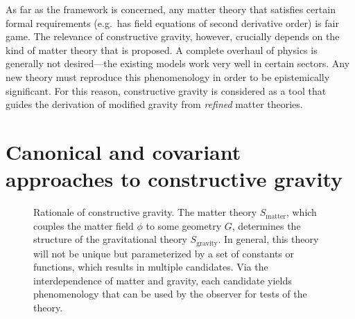 As far as the framework is concerned, any matter theory that satisfies certain formal requirements (e.g.~has field equations of second derivative order) is fair game. The relevance of constructive gravity, however, crucially depends on the kind of matter theory that is proposed. A complete overhaul of physics is generally not desired---the existing models work very well in certain sectors. Any new theory must reproduce this phenomenology in order to be epistemically significant. For this reason, constructive gravity is considered as a tool that guides the derivation of modified gravity from \emph{refined} matter theories.

\section{Canonical and covariant approaches to constructive gravity}
\begin{figure}
  \begin{center}
  \end{center}
  \caption{Rationale of constructive gravity. The matter theory $S_\text{matter}$, which couples the matter field $\phi$ to some geometry $G$, determines the structure of the gravitational theory $S_\text{gravity}$. In general, this theory will not be unique but parameterized by a set of constants or functions, which results in multiple candidates. Via the interdependence of matter and gravity, each candidate yields phenomenology that can be used by the observer for tests of the theory.}
  \label{figure_matter_gravity}
\end{figure}
